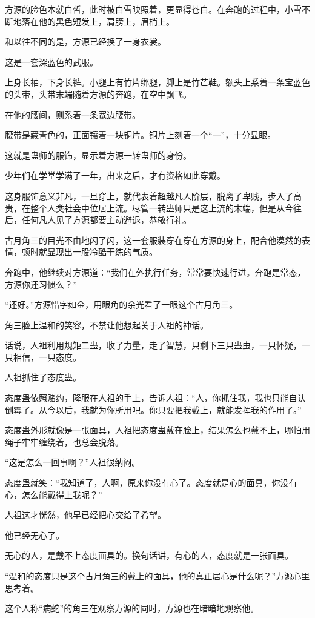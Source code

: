 \begin{this_body}
方源的脸色本就白皙，此时被白雪映照着，更显得苍白。在奔跑的过程中，小雪不断地落在他的黑色短发上，肩膀上，眉梢上。

和以往不同的是，方源已经换了一身衣裳。

这是一套深蓝色的武服。

上身长袖，下身长裤。小腿上有竹片绑腿，脚上是竹芒鞋。额头上系着一条宝蓝色的头带，头带末端随着方源的奔跑，在空中飘飞。

在他的腰间，则系着一条宽边腰带。

腰带是藏青色的，正面镶着一块铜片。铜片上刻着一个“一”，十分显眼。

这就是蛊师的服饰，显示着方源一转蛊师的身份。

少年们在学堂学满了一年，出来之后，才有资格如此穿戴。

这身服饰意义非凡，一旦穿上，就代表着超越凡人阶层，脱离了卑贱，步入了高贵，在整个人类社会中位居上流。尽管一转蛊师只是这上流的末端，但是从今往后，任何凡人见了方源都要主动避退，恭敬行礼。

古月角三的目光不由地闪了闪，这一套服装穿在穿在方源的身上，配合他漠然的表情，顿时就显现出一股冷酷干练的气质。

奔跑中，他继续对方源道：“我们在外执行任务，常常要快速行进。奔跑是常态，方源你还习惯么？”

“还好。”方源惜字如金，用眼角的余光看了一眼这个古月角三。

角三脸上温和的笑容，不禁让他想起关于人祖的神话。

话说，人祖利用规矩二蛊，收了力量，走了智慧，只剩下三只蛊虫，一只怀疑，一只相信，一只态度。

人祖抓住了态度蛊。

态度蛊依照赌约，降服在人祖的手上，告诉人祖：“人，你抓住我，我也只能自认倒霉了。从今以后，我就为你所用吧。你只要把我戴上，就能发挥我的作用了。”

态度蛊外形就像是一张面具，人祖把态度蛊戴在脸上，结果怎么也戴不上，哪怕用绳子牢牢缠绕着，也总会脱落。

“这是怎么一回事啊？”人祖很纳闷。

态度蛊就笑：“我知道了，人啊，原来你没有心了。态度就是心的面具，你没有心，怎么能戴得上我呢？”

人祖这才恍然，他早已经把心交给了希望。

他已经无心了。

无心的人，是戴不上态度面具的。换句话讲，有心的人，态度就是一张面具。

“温和的态度只是这个古月角三的戴上的面具，他的真正居心是什么呢？”方源心里思考着。

这个人称“病蛇”的角三在观察方源的同时，方源也在暗暗地观察他。

\end{this_body}

